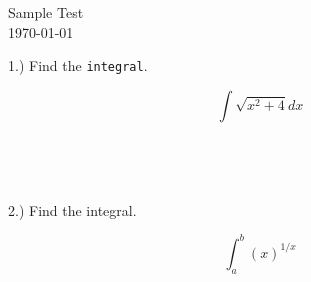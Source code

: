 

\usepackage{vmargin}
\usepackage{multicol}
\parindent=0in



\begin{flushleft}
Sample Test\\
\today
\end{flushleft}

1.) Find the \verb+integral+.

\begin{equation}
\int{\sqrt{x^2 + 4}} dx
\end{equation}

\begin{verbatim}




\end{verbatim}

2.)  Find the integral.

\begin{equation}
\int_a^b {(x)^{1/x}}
\end{equation}

\begin{verbatim}




\end{verbatim}




